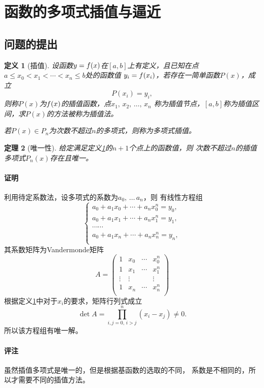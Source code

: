 \documentclass[12pt, a4paper]{article}
\theoremstyle{margin}
\newtheorem{thm}{定理}
\newtheorem{defi}[thm]{定义}
\newcommand{\f}{\mathnormal{f}}
\newcommand\defref[1]{定义\ref{#1}}
\newcommand{\remark}{\paragraph{评注}}
\newcommand{\proof}{\paragraph{证明}}
\begin{document}
\newpage
\section{函数的多项式插值与逼近}
\subsection{问题的提出}
  \begin{defi}[插值]
    \label{defi: 插值}
    设函数$y = \f(x)$在$[a, b]$上有定义，且已知在点
    $a\le x_0 < x_1 < \cdots < x_n \le b$处的函数值
    $y_i = \f(x_i)$，若存在一简单函数$P(x)$，成立
    \[
      P(x_i) = y_i,
    \]
    则称$P(x)$为$\f(x)$的插值函数，点$x_1,\,x_2,\,\dots,\,x_n$
    称为插值节点，$[a, b]$称为插值区间，求$P(x)$的方法被称为插值法。\par
    若$P(x) \in P_n$为次数不超过$n$的多项式，则称为多项式插值。
  \end{defi}

  \begin{thm}[唯一性]
    给定满足\defref{defi: 插值}的$n+1$个点上的函数值，则
    次数不超过$n$的插值多项式$P_n(x)$存在且唯一。
  \end{thm}
  \proof
    利用待定系数法，设多项式的系数为$a_0,\,\dots\,a_n$，则
    有线性方程组
    \[
      \left\{
      \begin{gathered}
          a_0 + a_1x_0 + \cdots + a_nx_0^n = y_0,\\
          a_0 + a_1x_1 + \cdots + a_nx_1^n = y_1,\\
          \cdots\cdots \\
          a_0 + a_1x_n + \cdots + a_nx_n^n = y_n,\\
      \end{gathered}
      \right.
    \]
    其系数矩阵为Vandermonde矩阵
    \[
      A =
      \begin{pmatrix}
        1 & x_0 & \cdots & x_0^n \\
        1 & x_1 & \cdots & x_1^n \\
        \vdots & \vdots & & \vdots \\
        1 & x_n & \cdots & x_n^n \\
      \end{pmatrix}
    \]
    根据\defref{defi: 插值}中对于$x_i$的要求，矩阵行列式成立
    \[
      \det A = \prod_{i,j=0,\,i>j}^n (x_i - x_j) \ne 0.
    \]
    所以该方程组有唯一解。
  \remark
    虽然插值多项式是唯一的，但是根据基函数的选取的不同，
    系数是不相同的，所以才需要不同的插值方法。
\end{document}
